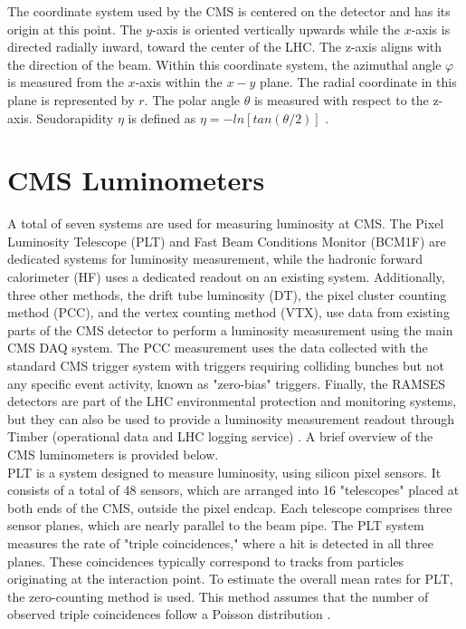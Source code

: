 The coordinate system used by the CMS is centered on the detector and has its origin at this point. The $y$-axis is oriented vertically upwards while the $x$-axis is directed radially inward, toward the center of the LHC. The z-axis aligns with the direction of the beam. Within this coordinate system, the azimuthal angle $\varphi$ is measured from the $x$-axis within the $x-y$ plane. The radial coordinate in this plane is represented by $r$. The polar angle $\theta$ is measured with respect to the z-axis. Seudorapidity $\eta$ is defined as $\eta = − ln[tan(\theta/2)]$ \cite{CMS_Exp_2008}.

\section{CMS Luminometers}
\label{Luminometers}

A total of seven systems are used for measuring luminosity at CMS. The Pixel Luminosity Telescope (PLT) and Fast Beam Conditions Monitor (BCM1F) are dedicated systems for luminosity measurement, while the hadronic forward calorimeter (HF) uses a dedicated readout on an existing system. Additionally, three other methods, the drift tube luminosity (DT), the pixel cluster counting method (PCC), and the vertex counting method (VTX), use data from existing parts of the CMS detector to perform a luminosity measurement using the main CMS DAQ system. The PCC measurement uses the data collected with the standard CMS trigger system with triggers requiring colliding bunches but not any specific event activity, known as "zero-bias" triggers. Finally, the RAMSES detectors are part of the LHC environmental protection and monitoring systems, but they can also be used to provide a luminosity measurement readout through Timber (operational data and LHC logging service) \cite{pas_18}.  A brief overview of the CMS luminometers is provided below.\\

PLT is a system designed to measure luminosity, using silicon pixel sensors. It consists of a total of 48 sensors, which are arranged into 16 "telescopes" placed at both ends of the CMS, outside the pixel endcap. Each telescope comprises three sensor planes, which are nearly parallel to the beam pipe. The PLT system measures the rate of "triple coincidences," where a hit is detected in all three planes. These coincidences typically correspond to tracks from particles originating at the interaction point. To estimate the overall mean rates for PLT, the zero-counting method is used. This method assumes that the number of observed triple coincidences follow a Poisson distribution \cite{pas_18}.\\

